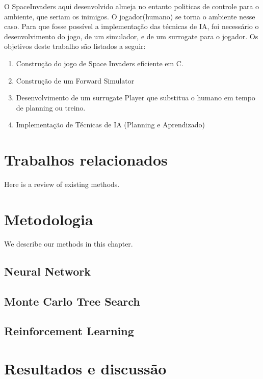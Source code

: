 \documentclass[]{book}
\providecommand{\tightlist}{%
  \setlength{\itemsep}{0pt}\setlength{\parskip}{0pt}}
\begin{document}
O SpaceInvaders aqui desenvolvido almeja no entanto politicas de
controle para o ambiente, que seriam os inimigos. O jogador(humano) se
torna o ambiente nesse caso. Para que fosse possível a implementação das
técnicas de IA, foi necessário o desenvolvimento do jogo, de um
simulador, e de um surrogate para o jogador. Os objetivos deste trabalho
são listados a seguir:

\begin{enumerate}
\def\labelenumi{\arabic{enumi}.}
\tightlist
\item
  Construção do jogo de Space Invaders eficiente em C.
\item
  Construção de um Forward Simulator
\item
  Desenvolvimento de um surrugate Player que substitua o humano em tempo
  de planning ou treino.
\item
  Implementação de Técnicas de IA (Planning e Aprendizado)
\end{enumerate}

\chapter{Trabalhos relacionados}\label{trabalhos-relacionados}

Here is a review of existing methods.

\chapter{Metodologia}\label{methods}

We describe our methods in this chapter.

\section{Neural Network}\label{neural-network}

\section{Monte Carlo Tree Search}\label{monte-carlo-tree-search}

\section{Reinforcement Learning}\label{reinforcement-learning}

\chapter{Resultados e discussão}\label{resultados-e-discussuxe3o}
\end{document}
